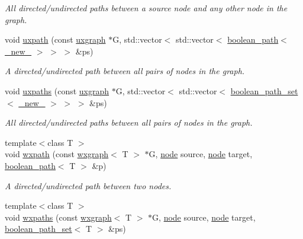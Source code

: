 \begin{DoxyCompactItemize}
\begin{DoxyCompactList}\small\item\em All directed/undirected paths between a source node and any other node in the graph. \end{DoxyCompactList}\item 
void \hyperlink{namespacelgraph_1_1traversal_ac2f98cd03640c664ef13e752bf440180}{uxpath} (const \hyperlink{classlgraph_1_1uxgraph}{uxgraph} $\ast$G, std\+::vector$<$ std\+::vector$<$ \hyperlink{classlgraph_1_1boolean__path}{boolean\+\_\+path}$<$ \hyperlink{namespacelgraph_a2836f966c1c36b43da337d8907728ec0}{\+\_\+new\+\_\+} $>$ $>$ $>$ \&ps)
\begin{DoxyCompactList}\small\item\em A directed/undirected path between all pairs of nodes in the graph. \end{DoxyCompactList}\item 
void \hyperlink{namespacelgraph_1_1traversal_a225d7bc5b36ef1863ad035ce1a8cb83b}{uxpaths} (const \hyperlink{classlgraph_1_1uxgraph}{uxgraph} $\ast$G, std\+::vector$<$ std\+::vector$<$ \hyperlink{namespacelgraph_afad432931ba600ab1628d5c9595986c5}{boolean\+\_\+path\+\_\+set}$<$ \hyperlink{namespacelgraph_a2836f966c1c36b43da337d8907728ec0}{\+\_\+new\+\_\+} $>$ $>$ $>$ \&ps)
\begin{DoxyCompactList}\small\item\em All directed/undirected paths between all pairs of nodes in the graph. \end{DoxyCompactList}\item 
{\footnotesize template$<$class T $>$ }\\void \hyperlink{namespacelgraph_1_1traversal_a2e3286cb7b83c0a47820b1d7256231ab}{wxpath} (const \hyperlink{classlgraph_1_1wxgraph}{wxgraph}$<$ T $>$ $\ast$G, \hyperlink{namespacelgraph_a397169dd66adf725210a30fb7251773e}{node} source, \hyperlink{namespacelgraph_a397169dd66adf725210a30fb7251773e}{node} target, \hyperlink{classlgraph_1_1boolean__path}{boolean\+\_\+path}$<$ T $>$ \&p)
\begin{DoxyCompactList}\small\item\em A directed/undirected path between two nodes. \end{DoxyCompactList}\item 
{\footnotesize template$<$class T $>$ }\\void \hyperlink{namespacelgraph_1_1traversal_af4f6d2630d596387b4ba4891c55a3773}{wxpaths} (const \hyperlink{classlgraph_1_1wxgraph}{wxgraph}$<$ T $>$ $\ast$G, \hyperlink{namespacelgraph_a397169dd66adf725210a30fb7251773e}{node} source, \hyperlink{namespacelgraph_a397169dd66adf725210a30fb7251773e}{node} target, \hyperlink{namespacelgraph_afad432931ba600ab1628d5c9595986c5}{boolean\+\_\+path\+\_\+set}$<$ T $>$ \&ps)

\end{DoxyCompactItemize}
